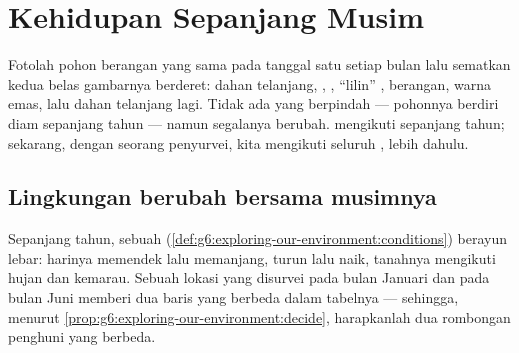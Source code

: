 \chapter{Kehidupan Sepanjang Musim}\label{ch:g6:life-through-seasons}

Fotolah pohon berangan yang sama pada tanggal satu setiap bulan lalu
sematkan kedua belas gambarnya berderet: dahan telanjang, ,
, ``lilin'' ,  berangan, warna emas, lalu dahan telanjang
lagi. Tidak ada yang berpindah --- pohonnya berdiri diam sepanjang
tahun --- namun segalanya berubah. 
mengikuti  sepanjang tahun; sekarang, dengan  seorang
penyurvei, kita mengikuti seluruh ,  lebih
dahulu.

\section{Lingkungan berubah bersama musimnya}

\begin{proposition}\label{prop:g6:life-through-seasons:conditions}
Sepanjang tahun,  sebuah 
(\cref{def:g6:exploring-our-environment:conditions}) berayun lebar:
harinya memendek lalu memanjang,  turun lalu naik, 
tanahnya mengikuti hujan dan kemarau. Sebuah lokasi yang disurvei pada
bulan Januari dan pada bulan Juni memberi dua baris yang berbeda dalam
tabelnya --- sehingga, menurut
\cref{prop:g6:exploring-our-environment:decide}, harapkanlah dua
rombongan penghuni yang berbeda.
\end{proposition}
\admitted

